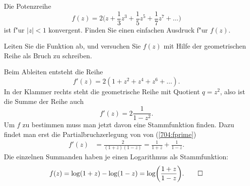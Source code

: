 Die Potenzreihe
\[
f(z)
=
2\biggl(z+\frac{1}{3}z^3+\frac{1}{5}z^5+\frac{1}{7}z^7+\dots\biggr)
\]
ist f"ur $|z|<1$ konvergent.
Finden Sie einen einfachen Ausdruck f"ur $f(z)$.

\begin{hinweis}
Leiten Sie die Funktion ab, und versuchen Sie $f(z)$ mit Hilfe der
geometrischen Reihe als Bruch zu schreiben.
\end{hinweis}

\begin{loesung}
Beim Ableiten entsteht die Reihe
\[
f'(z) = 2(1+z^2+z^4+z^6+\dots).
\]
In der Klammer rechts steht die geometrische Reihe mit Quotient $q=z^2$,
also ist die Summe der Reihe auch
\begin{equation}
f'(z)=2\frac{1}{1-z^2}.
\label{704:fprime}
\end{equation}
Um $f$ zu bestimmen muss man jetzt davon eine Stammfunktion finden.
Dazu findet man erst die Partialbruchzerlegung von von (\ref{704:fprime})
\begin{align*}
f'(z)
&=
\frac{2}{(1+z)(1-z)}
=
\frac1{1+z}+\frac1{1-z}.
\end{align*}
Die einzelnen Summanden haben je einen Logarithmus als Stammfunktion:
\[
f(z) = \log(1+z)-\log(1-z)=\log\biggl(\frac{1+z}{1-z}\biggr).
\qedhere
\]
\end{loesung}

